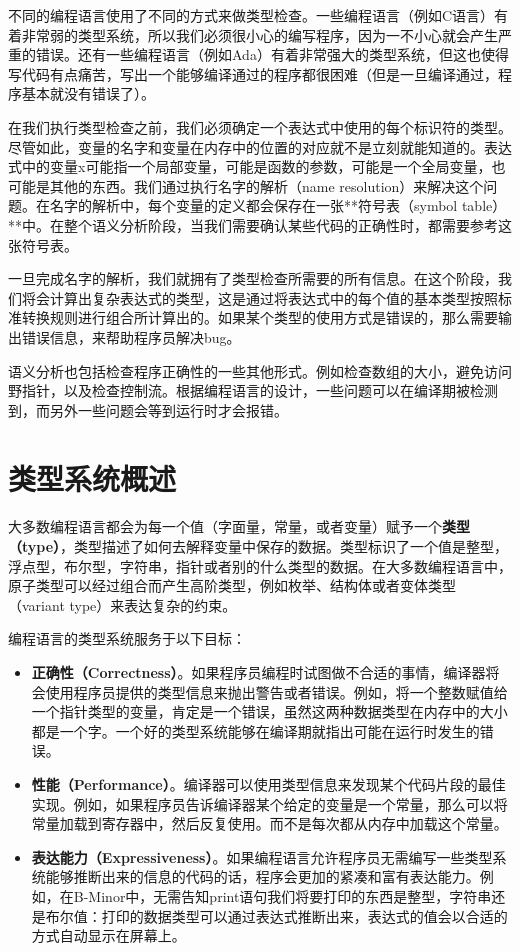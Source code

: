 \documentclass[cn,11pt,chinese]{elegantbook}
\begin{document}
不同的编程语言使用了不同的方式来做类型检查。一些编程语言（例如C语言）有着非常弱的类型系统，所以我们必须很小心的编写程序，因为一不小心就会产生严重的错误。还有一些编程语言（例如Ada）有着非常强大的类型系统，但这也使得写代码有点痛苦，写出一个能够编译通过的程序都很困难（但是一旦编译通过，程序基本就没有错误了）。

在我们执行类型检查之前，我们必须确定一个表达式中使用的每个标识符的类型。尽管如此，变量的名字和变量在内存中的位置的对应就不是立刻就能知道的。表达式中的变量x可能指一个局部变量，可能是函数的参数，可能是一个全局变量，也可能是其他的东西。我们通过执行名字的解析（name resolution）来解决这个问题。在名字的解析中，每个变量的定义都会保存在一张**符号表（symbol table）**中。在整个语义分析阶段，当我们需要确认某些代码的正确性时，都需要参考这张符号表。

一旦完成名字的解析，我们就拥有了类型检查所需要的所有信息。在这个阶段，我们将会计算出复杂表达式的类型，这是通过将表达式中的每个值的基本类型按照标准转换规则进行组合所计算出的。如果某个类型的使用方式是错误的，那么需要输出错误信息，来帮助程序员解决bug。

语义分析也包括检查程序正确性的一些其他形式。例如检查数组的大小，避免访问野指针，以及检查控制流。根据编程语言的设计，一些问题可以在编译期被检测到，而另外一些问题会等到运行时才会报错。

\section{类型系统概述}

大多数编程语言都会为每一个值（字面量，常量，或者变量）赋予一个\textbf{类型（type）}，类型描述了如何去解释变量中保存的数据。类型标识了一个值是整型，浮点型，布尔型，字符串，指针或者别的什么类型的数据。在大多数编程语言中，原子类型可以经过组合而产生高阶类型，例如枚举、结构体或者变体类型（variant type）来表达复杂的约束。

编程语言的类型系统服务于以下目标：

\begin{itemize}
  \item \textbf{正确性（Correctness）}。如果程序员编程时试图做不合适的事情，编译器将会使用程序员提供的类型信息来抛出警告或者错误。例如，将一个整数赋值给一个指针类型的变量，肯定是一个错误，虽然这两种数据类型在内存中的大小都是一个字。一个好的类型系统能够在编译期就指出可能在运行时发生的错误。
  \item \textbf{性能（Performance）}。编译器可以使用类型信息来发现某个代码片段的最佳实现。例如，如果程序员告诉编译器某个给定的变量是一个常量，那么可以将常量加载到寄存器中，然后反复使用。而不是每次都从内存中加载这个常量。
  \item \textbf{表达能力（Expressiveness）}。如果编程语言允许程序员无需编写一些类型系统能够推断出来的信息的代码的话，程序会更加的紧凑和富有表达能力。例如，在B-Minor中，无需告知print语句我们将要打印的东西是整型，字符串还是布尔值：打印的数据类型可以通过表达式推断出来，表达式的值会以合适的方式自动显示在屏幕上。
\end{itemize}
\end{document}
